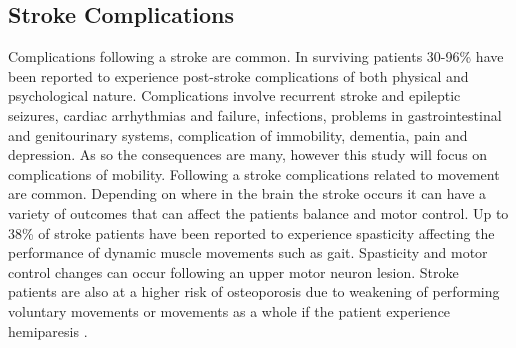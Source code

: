\subsection{Stroke Complications}
Complications following a stroke are common. In surviving patients 30-96\% have been reported to experience post-stroke complications of both physical and psychological nature. Complications involve recurrent stroke and epileptic seizures, cardiac arrhythmias and failure, infections, problems in gastrointestinal and genitourinary systems, complication of immobility, dementia, pain and depression.  \cite{Bhalla2016} %
As so the consequences are many, however this study will focus on complications of mobility. Following a stroke complications related to movement are common. Depending on where in the brain the stroke occurs it can have a variety of outcomes that can affect the patients balance and motor control. Up to 38\% of stroke patients have been reported to experience spasticity affecting the performance of dynamic muscle movements such as gait. Spasticity and motor control changes can occur following an upper motor neuron lesion. \cite{Bhalla2016} %
Stroke patients are also at a higher risk of osteoporosis due to weakening of performing voluntary movements or movements as a whole if the patient experience hemiparesis \cite{Bhalla2016}.
